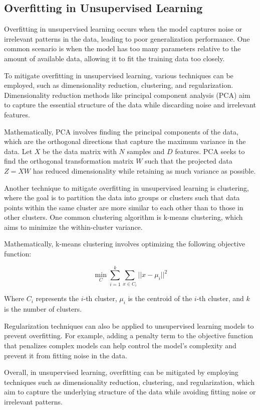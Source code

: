 \documentclass[12pt]{book} %
\begin{document}
\subsection{Overfitting in Unsupervised Learning}

Overfitting in unsupervised learning occurs when the model captures noise or irrelevant patterns in the data, leading to poor generalization performance. One common scenario is when the model has too many parameters relative to the amount of available data, allowing it to fit the training data too closely.

To mitigate overfitting in unsupervised learning, various techniques can be employed, such as dimensionality reduction, clustering, and regularization. Dimensionality reduction methods like principal component analysis (PCA) aim to capture the essential structure of the data while discarding noise and irrelevant features.

Mathematically, PCA involves finding the principal components of the data, which are the orthogonal directions that capture the maximum variance in the data. Let \( X \) be the data matrix with \( N \) samples and \( D \) features. PCA seeks to find the orthogonal transformation matrix \( W \) such that the projected data \( Z = XW \) has reduced dimensionality while retaining as much variance as possible.

Another technique to mitigate overfitting in unsupervised learning is clustering, where the goal is to partition the data into groups or clusters such that data points within the same cluster are more similar to each other than to those in other clusters. One common clustering algorithm is k-means clustering, which aims to minimize the within-cluster variance.

Mathematically, k-means clustering involves optimizing the following objective function:

\[
\min_{C} \sum_{i=1}^{k} \sum_{x \in C_i} ||x - \mu_i||^2
\]

Where \( C_i \) represents the \( i \)-th cluster, \( \mu_i \) is the centroid of the \( i \)-th cluster, and \( k \) is the number of clusters.

Regularization techniques can also be applied to unsupervised learning models to prevent overfitting. For example, adding a penalty term to the objective function that penalizes complex models can help control the model's complexity and prevent it from fitting noise in the data.

Overall, in unsupervised learning, overfitting can be mitigated by employing techniques such as dimensionality reduction, clustering, and regularization, which aim to capture the underlying structure of the data while avoiding fitting noise or irrelevant patterns.
\end{document}
